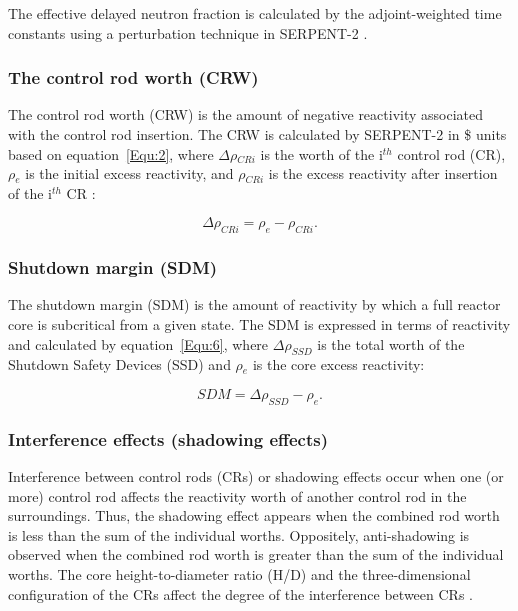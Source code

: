 The effective delayed neutron fraction is calculated by the adjoint-weighted time constants using a perturbation technique in SERPENT-2 \cite{leppanen2014calculation}.


\subsubsection{The control rod worth (CRW)}

The control rod worth (CRW) is the amount of negative reactivity associated with the control rod insertion. The CRW is calculated by SERPENT-2 in \$ units based on equation~\ref{Equ:2}, where $\Delta\rho$$_{CRi}$ is the worth of the i$^{th}$ control rod (CR), $\rho$$_e$ is the initial excess reactivity, and $\rho$$_{CRi}$ is the excess reactivity after insertion of the i$^{th}$ CR \cite{vcerba2017optimization}:

\begin{equation}
\label{Equ:2}
{{\Delta}{\rho}_{CRi}}={{\rho}_{e}}-{{\rho}_{CRi}}.
\end{equation}

\subsubsection{Shutdown margin (SDM)}

The shutdown margin (SDM) is the amount of reactivity by which a full reactor core is subcritical from a given state. The SDM is expressed in terms of reactivity and calculated by equation~\ref{Equ:6}, where $\Delta\rho_{SSD}$ is the total worth of the Shutdown Safety Devices (SSD) and $\rho$$_e$ is the core excess reactivity:

\begin{equation}
\label{Equ:6}
{SDM}={{\Delta}{\rho}_{SSD}}-{{\rho}_{e}}.
\end{equation}

\subsubsection{Interference effects (shadowing effects)}

Interference between control rods (CRs) or shadowing effects occur when one 
(or more) control rod affects the reactivity worth of another control rod in 
the surroundings. Thus, the shadowing effect appears when the combined rod worth
is less than the sum of the individual worths. Oppositely, anti-shadowing is observed 
when the combined rod worth is greater than the sum of the individual worths.
The core height-to-diameter ratio (H/D) and the three-dimensional configuration 
of the CRs affect the degree of the interference between CRs \cite{girardin2007control}. 

